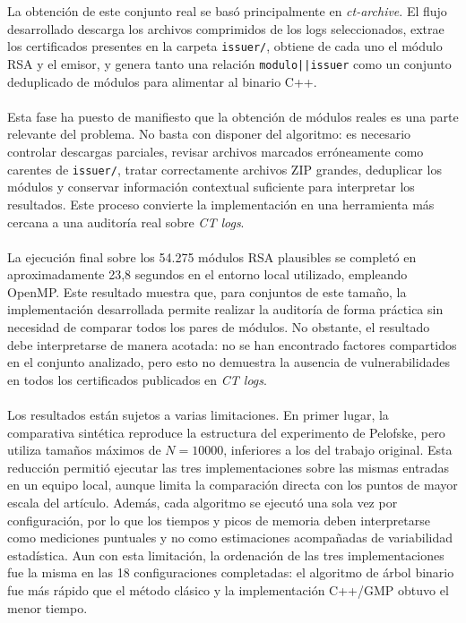 \\
\\
La obtención de este conjunto real se basó principalmente en \textit{ct-archive}. El flujo desarrollado descarga los archivos comprimidos de los logs seleccionados, extrae los certificados presentes en la carpeta \texttt{issuer/}, obtiene de cada uno el módulo RSA y el emisor, y genera tanto una relación \texttt{modulo||issuer} como un conjunto deduplicado de módulos para alimentar al binario C++.
\\
\\
Esta fase ha puesto de manifiesto que la obtención de módulos reales es una parte relevante del problema. No basta con disponer del algoritmo: es necesario controlar descargas parciales, revisar archivos marcados erróneamente como carentes de \texttt{issuer/}, tratar correctamente archivos ZIP grandes, deduplicar los módulos y conservar información contextual suficiente para interpretar los resultados. Este proceso convierte la implementación en una herramienta más cercana a una auditoría real sobre \textit{CT logs}.
\\
\\
La ejecución final sobre los 54.275 módulos RSA plausibles se completó en aproximadamente 23,8 segundos en el entorno local utilizado, empleando OpenMP. Este resultado muestra que, para conjuntos de este tamaño, la implementación desarrollada permite realizar la auditoría de forma práctica sin necesidad de comparar todos los pares de módulos. No obstante, el resultado debe interpretarse de manera acotada: no se han encontrado factores compartidos en el conjunto analizado, pero esto no demuestra la ausencia de vulnerabilidades en todos los certificados publicados en \textit{CT logs}.
\\
\\
Los resultados están sujetos a varias limitaciones. En primer lugar, la comparativa sintética reproduce la estructura del experimento de Pelofske, pero utiliza tamaños máximos de \(N=10000\), inferiores a los del trabajo original. Esta reducción permitió ejecutar las tres implementaciones sobre las mismas entradas en un equipo local, aunque limita la comparación directa con los puntos de mayor escala del artículo. Además, cada algoritmo se ejecutó una sola vez por configuración, por lo que los tiempos y picos de memoria deben interpretarse como mediciones puntuales y no como estimaciones acompañadas de variabilidad estadística. Aun con esta limitación, la ordenación de las tres implementaciones fue la misma en las 18 configuraciones completadas: el algoritmo de árbol binario fue más rápido que el método clásico y la implementación C++/GMP obtuvo el menor tiempo.

